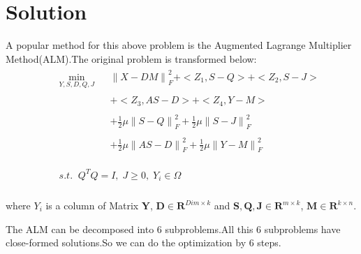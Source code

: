 \documentclass{article}
\begin{document}
\section{Solution}
A popular method for this above problem is the Augmented Lagrange Multiplier Method(ALM).The original problem is transformed below\;:
\begin{eqnarray}
&& \begin{array}{lll}
\mathop{\min}\limits_{Y,S,D,Q,J} && {\parallel X - DM\parallel}_F^2  +  <Z_1,S-Q>  + <Z_2,S-J> \\\\ && + <Z_3,AS-D>  + <Z_4 , Y-M> \\\\ &&
+ \frac{1}{2}\mu{\parallel S - Q\parallel}_F^2 +\frac{1}{2}\mu{\parallel S - J\parallel}_F^2 \\\\ && + \frac{1}{2}\mu{\parallel AS - D\parallel}_F^2 +
\frac{1}{2}\mu{\parallel Y - M\parallel}_F^2 \\
\end{array}\\ \nonumber \\
&& \begin{array}{lll}
s.t. \;\; Q^TQ = I , \; J \geq 0  , \; Y_i \in \Omega\nonumber
\end{array}
\end{eqnarray}\\
where $Y_i$ is a column of Matrix $\mathbf{Y}$, $\mathbf{D} \in \mathbf{R}^{Dim \times k}$ and $\mathbf{S,Q,J} \in \mathbf{R}^{m \times k}$, $\mathbf{M} \in \mathbf{R}^{k \times n}$.


The ALM can be decomposed into 6 subproblems.All this 6 subproblems have close-formed solutions.So we can do the optimization by 6 steps.\\
\end{document}
